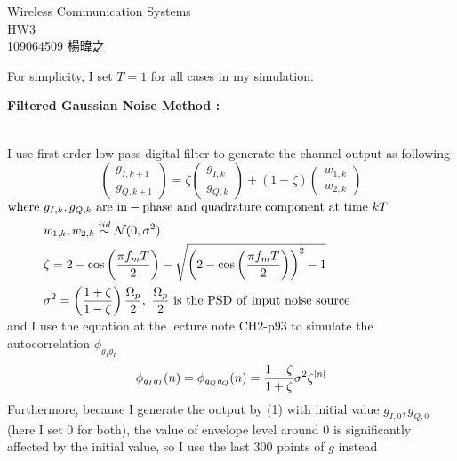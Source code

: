 \documentclass{article}
\begin{document}
\begin{titlepage}
\vspace*{\fill}
\begin{center}
\huge Wireless Communication Systems \\HW3\\ 109064509 楊暐之
\end{center}
\vspace{\fill}
\end{titlepage}

\begin{flushleft}
For simplicity, I set $T=1$ for all cases in my simulation.\\[0.5cm]
\begin{enumerate}
{\Large \item  \bf Filtered Gaussian Noise Method : }\\
I use first-order low-pass digital filter to generate the channel output as following
\begin{equation}
\begin{pmatrix}g_{I,k+1}\\g_{Q,k+1}\end{pmatrix}=\zeta\begin{pmatrix}g_{I,k}\\g_{Q,k}\end{pmatrix}+(1-\zeta)\begin{pmatrix}w_{1,k}\\w_{2,k}\end{pmatrix} 
\end{equation}
$\begin{aligned}
\mathrm {where}\ &g_{I,k},g_{Q,k}\ {\rm are\ in-phase\ and\ quadrature\ component\ at\ time\ }kT\\
&w_{1,k} , w_{2,k}\overset{iid}\sim\mathcal N(0,\sigma^2)\\
&\zeta=2-\cos\left(\frac{\pi f_mT}{2}\right)-\sqrt{\left(2-\cos\left(\frac{\pi f_mT}{2}\right)\right)^2-1}\\
&\sigma^2=\left(\frac{1+\zeta}{1-\zeta}\right)\frac{\Omega_p}{2},\ \frac{\Omega_p}{2}\ {\rm is\ the\ PSD\ of\ input\ noise\ source}
\end{aligned}$\\[0.2cm]
and I use the equation at the lecture note CH2-p93 to simulate the autocorrelation $\phi_{g_Ig_I}$
\begin{equation}
\phi_{g_Ig_I}(n)=\phi_{g_Qg_Q}(n)=\frac{1-\zeta}{1+\zeta}\sigma^2\zeta^{|n|}\notag
\end{equation}
Furthermore, because I generate the output  by (1) with initial value $g_{I,0},g_{Q,0}$(here I set 0 for both), the value of envelope level around 0 is significantly affected by the initial value, so I use the last 300 points of $g$ instead


\end{enumerate}
\end{flushleft}
\end{document}
